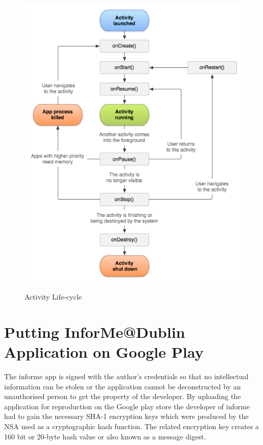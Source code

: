 \begin{figure}[htbp]
    \center \includegraphics[width=350pt]{ActivityLife}\\
    \caption{Activity Life-cycle \cite{androidlife}} \label{Figure: Activity Life-cycle}
\end{figure}

\newpage

\section{Putting InforMe@Dublin Application on Google Play}
The informe app is signed with the author's credentials so that no intellectual information can be stolen or the application cannot be deconstructed by an unauthorised person to get the property of the developer. By uploading the application for reproduction on the Google play store the developer of informe had to gain the necessary SHA-1 encryption keys which were produced by the NSA used as a cryptographic hash function. The related encryption key creates a 160 bit or 20-byte hash value or also known as a message digest. 

